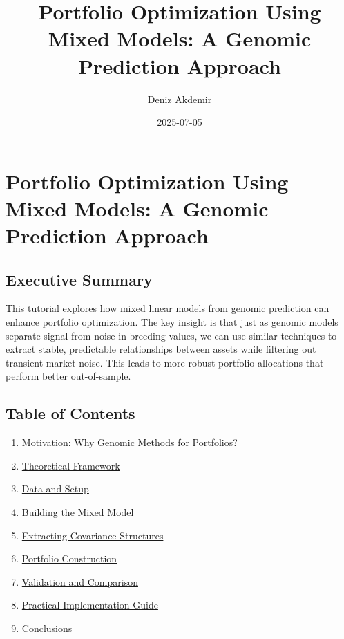 \documentclass[
]{article}
\title{Portfolio Optimization Using Mixed Models: A Genomic Prediction
Approach}
\author{Deniz Akdemir}
\date{2025-07-05}
\providecommand{\tightlist}{%
  \setlength{\itemsep}{0pt}\setlength{\parskip}{0pt}}
\begin{document}
\maketitle

{
\setcounter{tocdepth}{2}
\tableofcontents
}
\section{Portfolio Optimization Using Mixed Models: A Genomic Prediction
Approach}\label{portfolio-optimization-using-mixed-models-a-genomic-prediction-approach}

\subsection{Executive Summary}\label{executive-summary}

This tutorial explores how mixed linear models from genomic prediction
can enhance portfolio optimization. The key insight is that just as
genomic models separate signal from noise in breeding values, we can use
similar techniques to extract stable, predictable relationships between
assets while filtering out transient market noise. This leads to more
robust portfolio allocations that perform better out-of-sample.

\subsection{Table of Contents}\label{table-of-contents}

\begin{enumerate}
\def\labelenumi{\arabic{enumi}.}
\tightlist
\item
  \hyperref[motivation]{Motivation: Why Genomic Methods for Portfolios?}
\item
  \hyperref[theoretical-framework]{Theoretical Framework}
\item
  \hyperref[data-and-setup]{Data and Setup}
\item
  \hyperref[building-the-mixed-model]{Building the Mixed Model}
\item
  \hyperref[covariance-structures]{Extracting Covariance Structures}
\item
  \hyperref[portfolio-construction]{Portfolio Construction}
\item
  \hyperref[validation]{Validation and Comparison}
\item
  \hyperref[implementation-guide]{Practical Implementation Guide}
\item
  \hyperref[conclusions]{Conclusions}
\end{enumerate}
\end{document}
